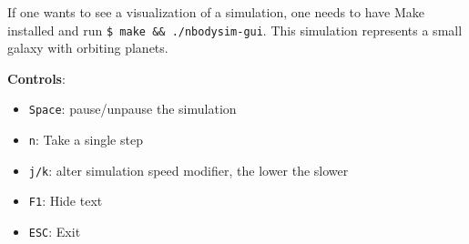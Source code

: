 If one wants to see a visualization of a simulation, one needs to have Make
installed and run \texttt{\$ make \&\& ./nbodysim-gui}. This simulation
represents a small galaxy with orbiting planets.

\noindent
\textbf{Controls}:
\begin{itemize}
  \item \texttt{Space}: pause/unpause the simulation
  \item \texttt{n}: Take a single step
  \item \texttt{j/k}: alter simulation speed modifier, the lower the slower
  \item \texttt{F1}: Hide text
  \item \texttt{ESC}: Exit
\end{itemize}
